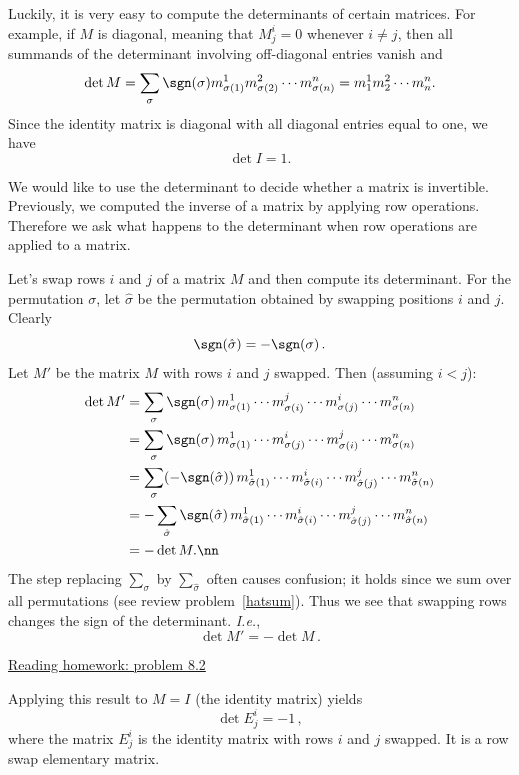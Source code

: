 Luckily, it is very easy to compute the determinants of certain matrices.  For example, if $M$ is diagonal, meaning that $M^i_j=0$ whenever $i\neq j$,  then all summands of the determinant involving off-diagonal entries vanish and 
\[
\det M = \sum_{\sigma} \sgn (\sigma) m^1_{\sigma(1)}m^2_{\sigma(2)}\cdots m^n_{\sigma(n)}= m^1_{1}m^2_{2}\cdots m^n_{n}.
\]
Since the identity matrix is diagonal with all diagonal entries equal to one, we have
\[
\det I=1.
\]

We would like to use the determinant to decide whether a matrix is invertible.  Previously, we computed the inverse of a matrix by applying row operations.  Therefore we ask what happens to the determinant when row operations are applied to a matrix.

\begin{remark}
Let's \hypertarget{rowswap}{swap}
 rows $i$ and $j$ of  a matrix $M$ and then compute its determinant.  For the permutation $\sigma$, let $\hat{\sigma}$ be the permutation obtained by swapping positions $i$ and $j$.  Clearly \[\sgn (\hat{\sigma})=-\sgn (\sigma)\, .\]  Let  $M'$ be the matrix $M$ with rows $i$ and $j$ swapped.  Then  (assuming $i<j$):
\begin{align}
\det M' & = \sum_{\sigma} \sgn (\sigma)\, m^1_{\sigma(1)}\cdots m^j_{\sigma(i)}\cdots m^i_{\sigma(j)} \cdots m^n_{\sigma(n)} \nonumber \\
& = \sum_{\sigma} \sgn (\sigma) \,m^1_{\sigma(1)}\cdots m^i_{\sigma(j)}\cdots m^j_{\sigma(i)} \cdots m^n_{\sigma(n)} \nonumber \\
& = \sum_{\sigma}(-\sgn (\hat{\sigma})) \,m^1_{\hat{\sigma}(1)}\cdots m^i_{\hat{\sigma}(i)}\cdots m^j_{\hat{\sigma}(j)} \cdots m^n_{\hat{\sigma}(n)} \nonumber \\
& = - \sum_{\hat{\sigma}} \sgn (\hat{\sigma}) \,m^1_{\hat{\sigma}(1)}\cdots m^i_{\hat{\sigma}(i)}\cdots m^j_{\hat{\sigma}(j)} \cdots m^n_{\hat{\sigma}(n)} \nonumber \\
& = -\det M.\nn
\end{align}
The step replacing $\sum_\sigma$ by $\sum_{\hat \sigma}$ often causes confusion; it holds since we sum over all permutations (see review problem~\ref{hatsum}).
Thus we see that swapping rows changes the sign of the determinant. {\itshape I.e.}, \[\det M' = - \det M\, .\]

\begin{center}\href{\webworkurl ReadingHomework8/2/}{Reading homework: problem 8.2}\end{center}

Applying this result to $M=I$ (the identity matrix) yields
\[\det E^i_j=-1\, ,\]
where the matrix $E^i_j$ is the identity matrix with rows $i$ and $j$ swapped. It is a row swap  elementary matrix.

\end{remark}

